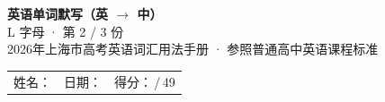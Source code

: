 \documentclass[10pt,a4paper]{article}
\begin{document}
\pagestyle{plain}

\begin{center}
{\LARGE\bfseries 英语单词默写（英 $\to$ 中）}\\[0.22em]
{\large L 字母 · 第 2 / 3 份}\\[0.18em]
{\small 2026年上海市高考英语词汇用法手册 · 参照普通高中英语课程标准}
\end{center}

\vspace{0.25em}
\noindent\begin{tabular}{@{}p{}@{}p{}@{}p{}@{}}
姓名：\underline{\hspace{2.0cm}} & 日期：\underline{\hspace{2.0cm}} & 得分：\underline{\hspace{1.3cm}}\,/\,49 \\
\end{tabular}

\vspace{0.3em}

\vspace{0.08em}
\end{document}
